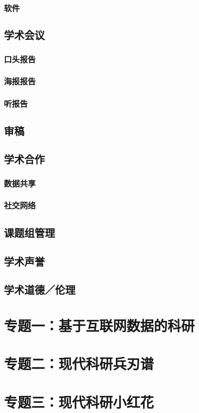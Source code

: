 \documentclass[]{book}
\begin{document}
\subsection{软件}

\section{学术会议}

\subsection{口头报告}

\subsection{海报报告}

\subsection{听报告}

\section{审稿}

\section{学术合作}

\subsection{数据共享}

\subsection{社交网络}

\section{课题组管理}

\section{学术声誉}

\section{学术道德／伦理}

\chapter{专题一：基于互联网数据的科研}

\chapter{专题二：现代科研兵刃谱}

\chapter{专题三：现代科研小红花}


\end{document}
